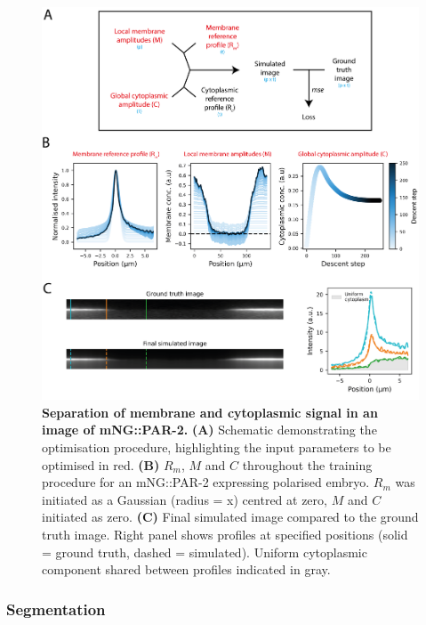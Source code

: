 \documentclass[12pt]{"article"}
\newcommand{\mycaption}[2]{\caption[#1]{\textbf{#1.} #2}}
\begin{document}
\begin{figure}
\includegraphics[scale=1]{memquant_membg_training}
\centering
\mycaption{Separation of membrane and cytoplasmic signal in an image of mNG::PAR-2}{
\textbf{(A)} Schematic demonstrating the optimisation procedure, highlighting the input parameters to be optimised in red.
\textbf{(B)} $R_m$, $M$ and $C$ throughout the training procedure for an mNG::PAR-2 expressing polarised embryo. $R_m$ was initiated as a Gaussian (radius = x) centred at zero, $M$ and $C$ initiated as zero.
\textbf{(C)} Final simulated image compared to the ground truth image. Right panel shows profiles at specified positions (solid = ground truth, dashed = simulated). Uniform cytoplasmic component shared between profiles indicated in gray.
}
\label{fig:memquant_membg_training}
\end{figure}


\subsubsection{Segmentation}
\end{document}
